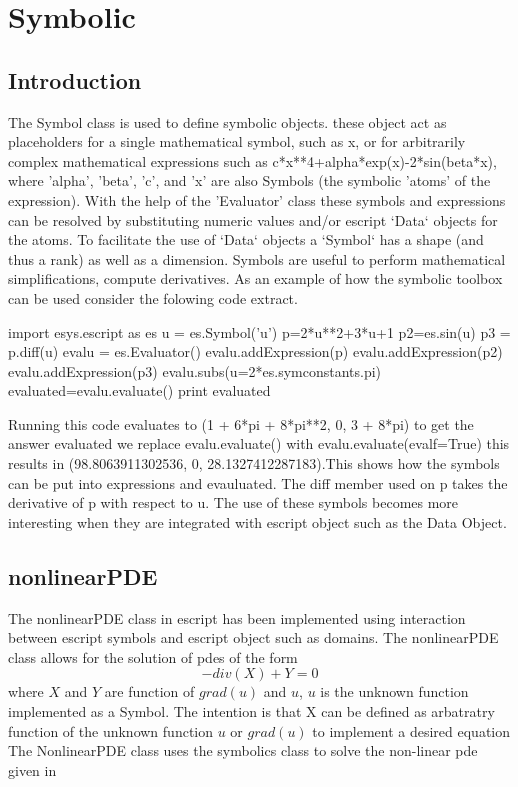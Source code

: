 \chapter{Symbolic}
\label{CHAP: Symbolic}
\section{Introduction}
The Symbol class is used to define symbolic objects. these object act as placeholders for a single mathematical symbol, 
such as x, or for arbitrarily complex mathematical expressions such as
c*x**4+alpha*exp(x)-2*sin(beta*x), where 'alpha', 'beta', 'c', and 'x'
are also Symbols (the symbolic 'atoms' of the expression).
With the help of the 'Evaluator' class these symbols and expressions can
be resolved by substituting numeric values and/or escript `Data` objects
for the atoms. To facilitate the use of `Data` objects a `Symbol` has a
shape (and thus a rank) as well as a dimension.
Symbols are useful to perform mathematical simplifications, compute
derivatives. As an example of how the symbolic toolbox can be used consider the folowing code extract.
\begin{python}
import esys.escript as es
u = es.Symbol('u')
p=2*u**2+3*u+1
p2=es.sin(u)
p3 = p.diff(u)
evalu = es.Evaluator()
evalu.addExpression(p)
evalu.addExpression(p2)
evalu.addExpression(p3)
evalu.subs(u=2*es.symconstants.pi)
evaluated=evalu.evaluate()
print evaluated
\end{python}
Running this code evaluates to (1 + 6*pi + 8*pi**2, 0, 3 + 8*pi) to get the answer evaluated we replace evalu.evaluate() with evalu.evaluate(evalf=True) this results in (98.8063911302536, 0, 28.1327412287183).This shows how the symbols can be put into expressions and evauluated. The diff member used on p takes the derivative of p with respect to u. The use of these symbols becomes more interesting when they are integrated with escript object such as the Data Object. 


\section{nonlinearPDE}
The nonlinearPDE class in escript has been implemented using interaction between escript symbols and escript object such as domains. The nonlinearPDE class allows for the solution of pdes of the form 
\begin{equation}
-div(X) + Y = 0
\label{symbolic eq1}
\end{equation}
where $X$ and $Y$ are function of $grad(u)$ and $u$, $u$ is the unknown function implemented as a Symbol.
The intention is that X can be defined as arbatratry function of the unknown function $u$ or $grad(u)$ to implement a desired equation 
The NonlinearPDE class uses the symbolics class to solve the non-linear pde given in 

